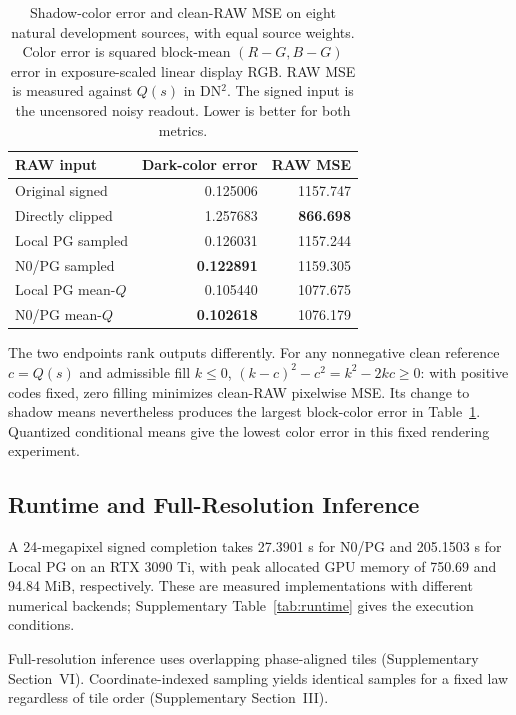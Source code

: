 \documentclass[10pt,twocolumn,journal]{IEEEtran}
\begin{document}
\begin{table}[t]
\centering
\caption{Shadow-color error and clean-RAW MSE on eight natural development sources, with equal source weights. Color error is squared block-mean $(R-G,B-G)$ error in exposure-scaled linear display RGB. RAW MSE is measured against $Q(s)$ in DN$^2$. The signed input is the uncensored noisy readout. Lower is better for both metrics.}
\label{tab:cleanendpoint}
\small
\setlength{\tabcolsep}{4pt}
\begin{tabular}{@{}lrr@{}}
\toprule
RAW input & Dark-color error & RAW MSE\\
\midrule
Original signed & 0.125006 & 1157.747\\
Directly clipped & 1.257683 & \textbf{866.698}\\
Local PG sampled & 0.126031 & 1157.244\\
N0/PG sampled & \textbf{0.122891} & 1159.305\\
Local PG mean-$Q$ & 0.105440 & 1077.675\\
N0/PG mean-$Q$ & \textbf{0.102618} & 1076.179\\
\bottomrule
\end{tabular}
\end{table}

The two endpoints rank outputs differently. For any nonnegative clean reference $c=Q(s)$ and admissible fill $k\leq0$, $(k-c)^2-c^2=k^2-2kc\geq0$: with positive codes fixed, zero filling minimizes clean-RAW pixelwise MSE. Its change to shadow means nevertheless produces the largest block-color error in Table~\ref{tab:cleanendpoint}. Quantized conditional means give the lowest color error in this fixed rendering experiment.

\subsection{Runtime and Full-Resolution Inference}\label{sec:runtime}
A 24-megapixel signed completion takes 27.3901 s for N0/PG and 205.1503 s for Local PG on an RTX 3090 Ti, with peak allocated GPU memory of 750.69 and 94.84 MiB, respectively. These are measured implementations with different numerical backends; Supplementary Table~\ref{tab:runtime} gives the execution conditions.

Full-resolution inference uses overlapping phase-aligned tiles (Supplementary Section~VI). Coordinate-indexed sampling yields identical samples for a fixed law regardless of tile order (Supplementary Section~III).
\end{document}
